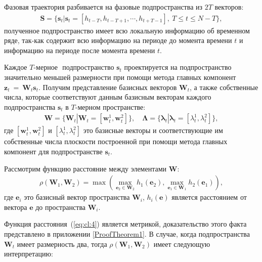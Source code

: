 \documentclass[12pt, twoside]{article}
\numberwithin{equation}{section}
\begin{document}
Фазовая траектория разбивается на фазовые подпространства из $2T$ векторов:
\begin{equation}
\label{eq:cl:2}
\begin{aligned}
\mathbf{S} = \{\textbf{s}_t| \textbf{s}_t = [h_{t-T}, h_{t-T+1}, \cdots, h_{t+T-1}],~T\leq t\leq N-T\},
\end{aligned}
\end{equation}
полученное подпространство имеет всю локальную информацию об временном ряде, так-как содержит всю информацию на периоде до момента времени $t$ и информацию на периоде после момента времени $t$.

Каждое $T\text{-мерное }$ подпространство $\textbf{s}_t$ проектируется на подпространство значительно меньшей размерности при помощи метода главных  компонент~$\textbf{z}_t~=~\textbf{W}_t\textbf{s}_t$. Получим представление базисных векторов $\textbf{W}_t$, а также собственные числа, которые соответствуют данным базисным векторам каждого подпространства $\textbf{s}_t$ в $T\text{-мерном}$ пространстве:
\begin{equation}
\label{eq:cl:3}
\begin{aligned}
\mathbf{W} = \{\textbf{W}_t| \textbf{W}_t = [\textbf{w}^1_t, \textbf{w}^2_t]\}, \quad \bm{\Lambda} = \{\bm{\lambda}_t| \bm{\lambda}_t=[\lambda^1_t, \lambda^2_t]\},
\end{aligned}
\end{equation}
где $[\textbf{w}^1_t, \textbf{w}^2_t]$ и $[\lambda^1_t, \lambda^2_t]$ это базисные векторы и соответствующие им собственные числа плоскости построенной при помощи метода главных компонент для подпространстве $\textbf{s}_t$.

Рассмотрим функцию расстояние между элементами $\mathbf{W}$:
\begin{equation}
\label{eq:cl:4}
\begin{aligned}
\rho\left(\textbf{W}_1, \textbf{W}_2\right) = \max\left(\max_{\textbf{e}_2 \in \textbf{W}_2} h_{1}\left(\textbf{e}_2\right), \max_{\textbf{e}_1 \in \textbf{W}_1} h_{2}\left(\textbf{e}_1\right)\right),
\end{aligned}
\end{equation}
где  $\textbf{e}_i$ это базисный вектор пространства $\textbf{W}_i$, $h_i\left(\textbf{e}\right)$ является расстоянием от вектора $\textbf{e}$ до пространства $\textbf{W}_i$.

Функция расстояния~(\ref{eq:cl:4}) является метрикой, доказательство этого факта представлено в приложении \ref{ProofTheorem1}. В случае, когда подпространства $\textbf{W}_t$ имеет размерность два, тогда $\rho\left(\textbf{W}_1, \textbf{W}_2\right)$ имеет следующую интерпретацию:
\end{document}
